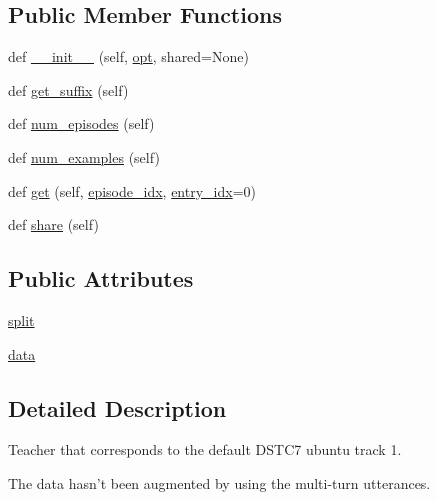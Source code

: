 \subsection*{Public Member Functions}
\begin{DoxyCompactItemize}
\item 
def \hyperlink{classparlai_1_1tasks_1_1dstc7_1_1agents_1_1DSTC7Teacher_a5773b0073045b31e9308070e271e8b15}{\+\_\+\+\_\+init\+\_\+\+\_\+} (self, \hyperlink{classparlai_1_1core_1_1agents_1_1Teacher_a3ce6243860ce978a897922863ed32fa4}{opt}, shared=None)
\item 
def \hyperlink{classparlai_1_1tasks_1_1dstc7_1_1agents_1_1DSTC7Teacher_a2355675a4798e716d6d5788ba9de109e}{get\+\_\+suffix} (self)
\item 
def \hyperlink{classparlai_1_1tasks_1_1dstc7_1_1agents_1_1DSTC7Teacher_a259540f4c5e9d81c2295a2a45f3f87dd}{num\+\_\+episodes} (self)
\item 
def \hyperlink{classparlai_1_1tasks_1_1dstc7_1_1agents_1_1DSTC7Teacher_aeaff98c183e9c50d97f84c9c3d387aac}{num\+\_\+examples} (self)
\item 
def \hyperlink{classparlai_1_1tasks_1_1dstc7_1_1agents_1_1DSTC7Teacher_adceeb772d4efa50b44f502d38bdb3049}{get} (self, \hyperlink{classparlai_1_1core_1_1teachers_1_1FixedDialogTeacher_afd4ebab8063eb42d182d30a1a41f133e}{episode\+\_\+idx}, \hyperlink{classparlai_1_1core_1_1teachers_1_1FixedDialogTeacher_ae3201b15f3c3b46a2f3511bad9b43e7d}{entry\+\_\+idx}=0)
\item 
def \hyperlink{classparlai_1_1tasks_1_1dstc7_1_1agents_1_1DSTC7Teacher_ae7b7bba23f2f3914186915824280a5d5}{share} (self)
\end{DoxyCompactItemize}
\subsection*{Public Attributes}
\begin{DoxyCompactItemize}
\item 
\hyperlink{classparlai_1_1tasks_1_1dstc7_1_1agents_1_1DSTC7Teacher_a441e080f8a4514fb9c3b8a1872dea4e3}{split}
\item 
\hyperlink{classparlai_1_1tasks_1_1dstc7_1_1agents_1_1DSTC7Teacher_a1410f6e230ea0a01e373e2dde387440a}{data}
\end{DoxyCompactItemize}


\subsection{Detailed Description}
\begin{DoxyVerb}Teacher that corresponds to the default DSTC7 ubuntu track 1.

The data hasn't been augmented by using the multi-turn utterances.
\end{DoxyVerb}
 

